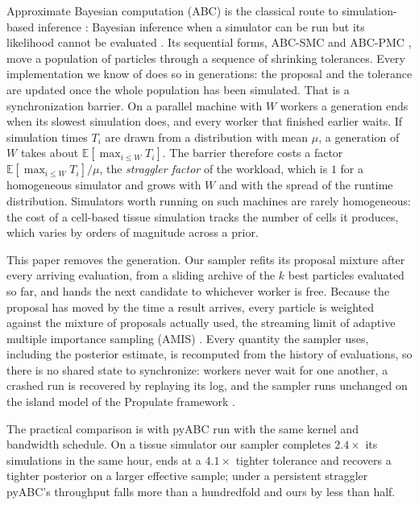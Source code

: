 \documentclass[10pt]{article}
\theoremstyle{plain}
\theoremstyle{definition}
\begin{document}
Approximate Bayesian computation (ABC) is the classical route to simulation-based inference \citep{cranmer2020frontier}: Bayesian inference when a simulator can be run but its likelihood cannot be evaluated \citep{beaumont2019abc}. Its sequential forms, ABC-SMC and ABC-PMC \citep{sisson2007,toni2009abcsmc,beaumont2009adaptive,delmoral2012adaptive}, move a population of particles through a sequence of shrinking tolerances. Every implementation we know of does so in generations: the proposal and the tolerance are updated once the whole population has been simulated. That is a synchronization barrier. On a parallel machine with $W$ workers a generation ends when its slowest simulation does, and every worker that finished earlier waits. If simulation times $T_i$ are drawn from a distribution with mean $\mu$, a generation of $W$ takes about $\mathbb{E}[\max_{i\le W}T_i]$. The barrier therefore costs a factor $\mathbb{E}[\max_{i\le W}T_i]/\mu$, the \emph{straggler factor} of the workload, which is $1$ for a homogeneous simulator and grows with $W$ and with the spread of the runtime distribution. Simulators worth running on such machines are rarely homogeneous: the cost of a cell-based tissue simulation tracks the number of cells it produces, which varies by orders of magnitude across a prior.

This paper removes the generation. Our sampler refits its proposal mixture after every arriving evaluation, from a sliding archive of the $k$ best particles evaluated so far, and hands the next candidate to whichever worker is free. Because the proposal has moved by the time a result arrives, every particle is weighted against the mixture of proposals actually used, the streaming limit of adaptive multiple importance sampling (AMIS) \citep{cornuet2012amis}. Every quantity the sampler uses, including the posterior estimate, is recomputed from the history of evaluations, so there is no shared state to synchronize: workers never wait for one another, a crashed run is recovered by replaying its log, and the sampler runs unchanged on the island model of the Propulate framework \citep{taubert2023propulate}.

The practical comparison is with pyABC \citep{klinger2018pyabc} run with the same kernel and bandwidth schedule. On a tissue simulator our sampler completes $2.4\times$ its simulations in the same hour, ends at a $4.1\times$ tighter tolerance and recovers a tighter posterior on a larger effective sample; under a persistent straggler pyABC's throughput falls more than a hundredfold and ours by less than half.
\end{document}
